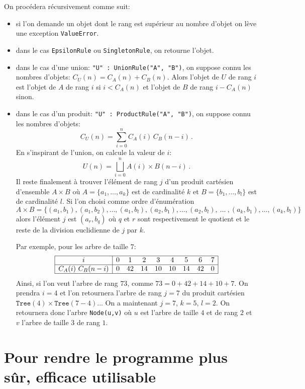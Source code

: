\documentclass[11pt]{article}
\begin{document}
On procédera récursivement comme suit:
\begin{itemize}
\item si l'on demande un objet dont le rang est supérieur au nombre d'objet on
  lève une exception \texttt{ValueError}.
\item dans le cas \texttt{EpsilonRule} ou \texttt{SingletonRule}, on retourne
  l'objet.
\item dans le cas d'une union: \texttt{"U" : UnionRule("A", "B")}, on suppose
  connu les nombres d'objets: $C_U(n) = C_A(n) + C_B(n)$. Alors l'objet de $U$
  de rang $i$ est l'objet de $A$ de rang $i$ si $i<C_A(n)$ et l'objet de $B$
  de rang $i-C_A(n)$ sinon.
\item dans le cas d'un produit: \texttt{"U" : ProductRule("A", "B")}, on suppose
  connu les nombres d'objets:
  $$
  C_U(n) = \sum_{i=0}^n C_A(i)\,C_B(n-i)\,.
  $$
  En s'inspirant de l'union, on calcule la valeur de $i$:
  $$
  U(n) = \bigsqcup_{i=0}^n A(i) \times B(n-i)\,.
  $$
  Il reste finalement à trouver l'élément de rang $j$ d'un produit cartésien
  d'ensemble $A\times B$ où $A=\{a_1,\dots,a_k\}$ est de cardinalité $k$ et
  $B=\{b_1,\dots,b_l\}$ est de cardinalité $l$. Si l'on choisi comme ordre
  d'énumération
  $$
  A\times B =\{(a_1, b_1), (a_1, b_2), \dots, (a_1, b_l),
               (a_2, b_1), \dots, (a_2, b_l),
               \ \dots\ ,
               (a_k, b_1), \dots, (a_k, b_l)\}
  $$
  alors l'élément $j$ est $(a_{r}, b_{q})$ où $q$ et $r$ sont respectivement
  le quotient et le reste de la division euclidienne de $j$ par $k$.

  Par exemple, pour les arbre de taille $7$:
  $$
  \begin{array}{|c|cccccccc|}
    \hline
    i           & 0&  1&  2&  3&  4&  5&  6& 7\\
    \hline
    C_A(i)\ C_B(n-i)  & 0& 42& 14& 10& 10& 14& 42& 0\\
    \hline
  \end{array}
  $$
  Ainsi, si l'on veut l'arbre de rang $73$, comme $73 = 0+42+14+10+7$. On
  prendra $i=4$ et l'on retournera l'arbre de rang $j=7$ du produit cartésien
  $\texttt{Tree}(4) \times \texttt{Tree}(7-4)$...  On a maintenant $j=7$,
  $k=5$, $l=2$. On retournera donc l'arbre \texttt{Node(u,v)} où $u$ est
  l'arbre de taille $4$ et de rang $2$ et $v$ l'arbre de taille $3$ de rang
  $1$.
\end{itemize}

\section{Pour rendre le programme plus sûr, efficace utilisable}
\end{document}
